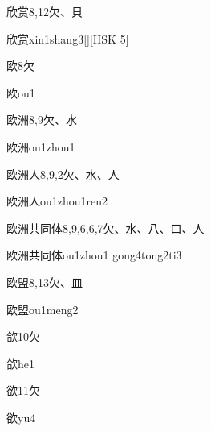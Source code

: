 \begin{entry}{欣赏}{8,12}{⽋、⾙}
  \begin{phonetics}{欣赏}{xin1shang3}[][HSK 5]
  \end{phonetics}
\end{entry}

\begin{entry}{欧}{8}{⽋}
  \begin{phonetics}{欧}{ou1}
  \end{phonetics}
\end{entry}

\begin{entry}{欧洲}{8,9}{⽋、⽔}
  \begin{phonetics}{欧洲}{ou1zhou1}
  \end{phonetics}
\end{entry}

\begin{entry}{欧洲人}{8,9,2}{⽋、⽔、⼈}
  \begin{phonetics}{欧洲人}{ou1zhou1ren2}
  \end{phonetics}
\end{entry}

\begin{entry}{欧洲共同体}{8,9,6,6,7}{⽋、⽔、⼋、⼝、⼈}
  \begin{phonetics}{欧洲共同体}{ou1zhou1 gong4tong2ti3}
  \end{phonetics}
\end{entry}

\begin{entry}{欧盟}{8,13}{⽋、⽫}
  \begin{phonetics}{欧盟}{ou1meng2}
  \end{phonetics}
\end{entry}

\begin{entry}{欱}{10}{⽋}
  \begin{phonetics}{欱}{he1}
  \end{phonetics}
\end{entry}

\begin{entry}{欲}{11}{⽋}
  \begin{phonetics}{欲}{yu4}
  \end{phonetics}
\end{entry}

